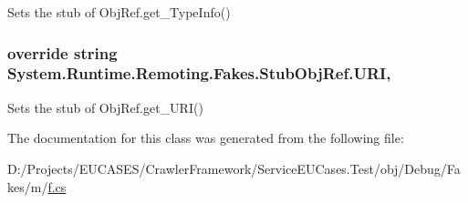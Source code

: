 Sets the stub of Obj\-Ref.\-get\-\_\-\-Type\-Info()

\hypertarget{class_system_1_1_runtime_1_1_remoting_1_1_fakes_1_1_stub_obj_ref_adc7b9cf649921ea894283a334d299c90}{
\subsubsection[{U\-R\-I}]{\setlength{\rightskip}{0pt plus 5cm}override string System.\-Runtime.\-Remoting.\-Fakes.\-Stub\-Obj\-Ref.\-U\-R\-I\hspace{0.3cm}{\ttfamily [get]}, {\ttfamily [set]}}}\label{class_system_1_1_runtime_1_1_remoting_1_1_fakes_1_1_stub_obj_ref_adc7b9cf649921ea894283a334d299c90}


Sets the stub of Obj\-Ref.\-get\-\_\-\-U\-R\-I()



The documentation for this class was generated from the following file\-:\begin{DoxyCompactItemize}
\item 
D\-:/\-Projects/\-E\-U\-C\-A\-S\-E\-S/\-Crawler\-Framework/\-Service\-E\-U\-Cases.\-Test/obj/\-Debug/\-Fakes/m/\hyperlink{m_2f_8cs}{f.\-cs}\end{DoxyCompactItemize}

